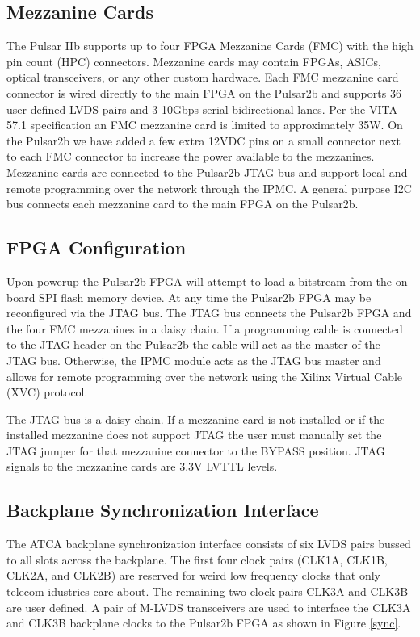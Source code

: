 \documentclass[letterpaper]{article}
\begin{document}
\subsection{Mezzanine Cards}

The Pulsar IIb supports up to four FPGA Mezzanine Cards (FMC) with the high pin count (HPC) connectors.  Mezzanine cards may contain FPGAs, ASICs, optical transceivers, or any other custom hardware.  Each FMC mezzanine card connector is wired directly to the main FPGA on the Pulsar2b and supports 36 user-defined LVDS pairs and 3 10Gbps serial bidirectional lanes.  Per the VITA 57.1 specification an FMC mezzanine card is limited to approximately 35W.  On the Pulsar2b we have added a few extra 12VDC pins on a small connector next to each FMC connector to increase the power available to the mezzanines.  Mezzanine cards are connected to the Pulsar2b JTAG bus and support local and remote programming over the network through the IPMC.  A general purpose I2C bus connects each mezzanine card to the main FPGA on the Pulsar2b.

\subsection{FPGA Configuration}

Upon powerup the Pulsar2b FPGA will attempt to load a bitstream from the on-board SPI flash memory device.  At any time the Pulsar2b FPGA may be reconfigured via the JTAG bus.  The JTAG bus connects the Pulsar2b FPGA and the four FMC mezzanines in a daisy chain.  If a programming cable is connected to the JTAG header on the Pulsar2b the cable will act as the master of the JTAG bus.  Otherwise, the IPMC module acts as the JTAG bus master and allows for remote programming over the network using the Xilinx Virtual Cable (XVC) protocol.

The JTAG bus is a daisy chain.  If a mezzanine card is not installed or if the installed mezzanine does not support JTAG the user must manually set the JTAG jumper for that mezzanine connector to the BYPASS position.  JTAG signals to the mezzanine cards are 3.3V LVTTL levels.

\subsection{Backplane Synchronization Interface}
\label{section_bp_sync}

The ATCA backplane synchronization interface consists of six LVDS pairs bussed to all slots across the backplane.  The first four clock pairs (CLK1A, CLK1B, CLK2A, and CLK2B) are reserved for weird low frequency clocks that only telecom idustries care about.  The remaining two clock pairs CLK3A and CLK3B are user defined.  A pair of M-LVDS transceivers are used to interface the CLK3A and CLK3B backplane clocks to the Pulsar2b FPGA as shown in Figure \ref{sync}.
\end{document}

